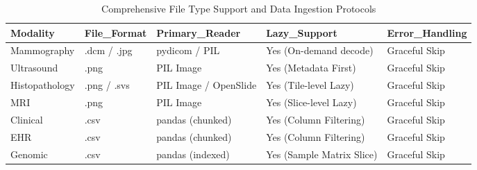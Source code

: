 \begin{table}
\caption{Comprehensive File Type Support and Data Ingestion Protocols}
\label{tab:table_supported_file_types}
\begin{tabular}{lllll}
\toprule
Modality & File\_Format & Primary\_Reader & Lazy\_Support & Error\_Handling \\
\midrule
Mammography & .dcm / .jpg & pydicom / PIL & Yes (On-demand decode) & Graceful Skip \\
Ultrasound & .png & PIL Image & Yes (Metadata First) & Graceful Skip \\
Histopathology & .png / .svs & PIL Image / OpenSlide & Yes (Tile-level Lazy) & Graceful Skip \\
MRI & .png & PIL Image & Yes (Slice-level Lazy) & Graceful Skip \\
Clinical & .csv & pandas (chunked) & Yes (Column Filtering) & Graceful Skip \\
EHR & .csv & pandas (chunked) & Yes (Column Filtering) & Graceful Skip \\
Genomic & .csv & pandas (indexed) & Yes (Sample Matrix Slice) & Graceful Skip \\
\bottomrule
\end{tabular}
\end{table}
